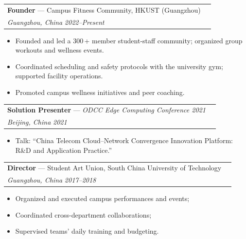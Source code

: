 \noindent
\begin{tabularx}{\textwidth}{@{}Xr@{}}
\textbf{Founder} — Campus Fitness Community, HKUST (Guangzhou)  \\
\textit{Guangzhou, China} \hfill \textit{2022--Present}
\end{tabularx}
\begin{itemize}[leftmargin=*]
  \item Founded and led a 300\,+ member student-staff community; organized group workouts and wellness events.
  \item Coordinated scheduling and safety protocols with the university gym; supported facility operations.
  \item Promoted campus wellness initiatives and peer coaching.
\end{itemize}



\noindent
\begin{tabularx}{\textwidth}{@{}Xr@{}}
\textbf{Solution Presenter} — \textit{ODCC Edge Computing Conference 2021} \\
\textit{Beijing, China} \hfill \textit{2021}
\end{tabularx}
\begin{itemize}[leftmargin=*]
  \item Talk: “China Telecom Cloud--Network Convergence Innovation Platform: R\&D and Application Practice.”
\end{itemize}


\noindent
\begin{tabularx}{\textwidth}{@{}Xr@{}}
\textbf{Director} — Student Art Union, South China University of Technology\\
\textit{Guangzhou, China}  \hfill \textit{2017--2018}
\end{tabularx}
\begin{itemize}[leftmargin=*]
  \item Organized and executed campus performances and events;
  \item Coordinated cross-department collaborations;
  \item Supervised teams' daily training and budgeting.
\end{itemize}

